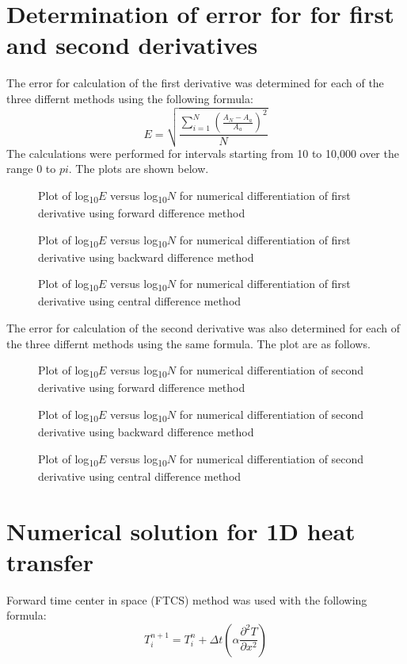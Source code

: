 \documentclass[12pt,a4paper,fleqn]{article}
\begin{document}
\section*{Determination of error for for first and second derivatives}
The error for calculation of the first derivative was determined for
each of the three differnt methods using the following formula:
\begin{equation}
E = \sqrt{\frac{\sum\limits_{i=1}^{N}\left(\frac{A_N-A_a}{A_a}\right)^2}{N}}
\end{equation}
The calculations were performed for intervals starting from 10 to 10,000 over
the range 0 to $pi$. The plots are shown below.
\begin{figure}[p!]
\centering

\caption{Plot of log\textsubscript{10}$E$ versus log\textsubscript{10}$N$ for
numerical differentiation of first derivative using forward difference method}
\end{figure}
\begin{figure}[p!]
\centering

\caption{Plot of log\textsubscript{10}$E$ versus log\textsubscript{10}$N$ for
numerical differentiation of first derivative using backward difference method}
\end{figure}
\begin{figure}[p!]
\centering

\caption{Plot of log\textsubscript{10}$E$ versus log\textsubscript{10}$N$ for
numerical differentiation of first derivative using central difference method}
\end{figure}

The error for calculation of the second derivative was also determined for
each of the three differnt methods using the same formula. The plot are as
follows.
\begin{figure}[p!]
\centering

\caption{Plot of log\textsubscript{10}$E$ versus log\textsubscript{10}$N$ for
numerical differentiation of second derivative using forward difference method}
\end{figure}
\begin{figure}[p!]
\centering

\caption{Plot of log\textsubscript{10}$E$ versus log\textsubscript{10}$N$ for
numerical differentiation of second derivative using backward difference method}
\end{figure}
\begin{figure}[p!]
\centering

\caption{Plot of log\textsubscript{10}$E$ versus log\textsubscript{10}$N$ for
numerical differentiation of second derivative using central difference method}
\end{figure}
\newpage
\section*{Numerical solution for 1D heat transfer}
Forward time center in space (FTCS) method was used with the following formula:
\begin{equation}
T_i^{n+1} = T_i^n + \Delta t(\alpha \frac{\partial^2T}{\partial x^2})
\end{equation}
\end{document}

